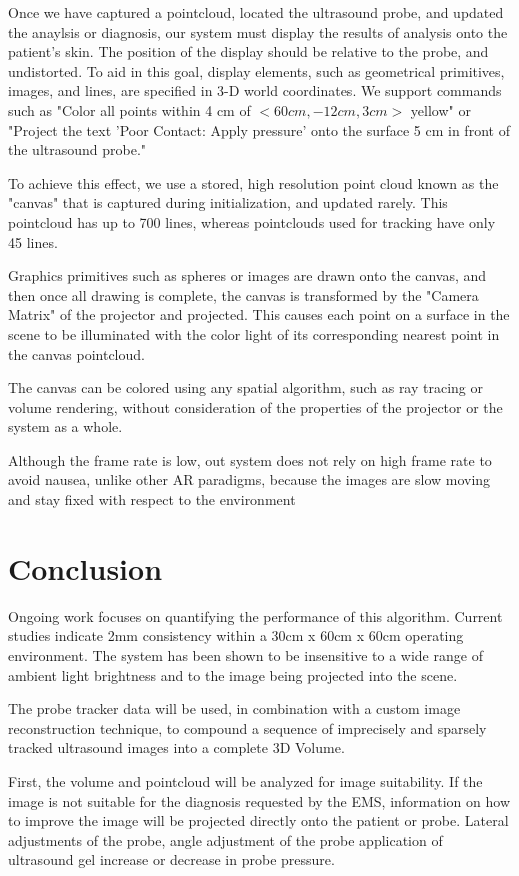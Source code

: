 \documentclass{llncs}
\begin{document}
Once we have captured a pointcloud, located the ultrasound probe, and updated the anaylsis or diagnosis, our system must display the results of analysis onto the patient's skin. The position of the display should be relative to the probe, and undistorted. To aid in this goal, display elements, such as geometrical primitives, images, and lines, are specified in 3-D world coordinates. We support commands such as "Color all points within 4 cm of $<60 cm, -12 cm, 3 cm>$ yellow" or "Project the text 'Poor Contact: Apply pressure' onto the surface 5 cm in front of the ultrasound probe."

To achieve this effect, we use a stored, high resolution point cloud known as the "canvas" that is captured during initialization, and updated rarely. This pointcloud has up to 700 lines, whereas pointclouds used for tracking have only 45 lines. 

Graphics primitives such as spheres or images are drawn onto the canvas, and then once all drawing is complete, the canvas is transformed by the "Camera Matrix" of the projector and projected. This causes each point on a surface in the scene to be illuminated with the color light of its corresponding nearest point in the canvas pointcloud. 

The canvas can be colored using any spatial algorithm, such as ray tracing or volume rendering, without consideration of the properties of the projector or the system as a whole.

Although the frame rate is low, out system does not rely on high frame rate to avoid nausea, unlike other AR paradigms, because the images are slow moving and stay fixed with respect to the environment 

\section{Conclusion}
Ongoing work focuses on quantifying the performance of this algorithm.  Current studies indicate 2mm consistency within a 30cm x 60cm x 60cm operating environment.  The system has been shown to be insensitive to a wide range of ambient light brightness and to the image being projected into the scene.

The probe tracker data will be used, in combination with a custom image reconstruction technique, to compound a sequence of imprecisely and sparsely tracked ultrasound images into a complete 3D Volume.

First, the volume and pointcloud will be analyzed for image suitability. If the image is not suitable for the diagnosis requested by the EMS, information on how to improve the image will be projected directly onto the patient or probe. Lateral adjustments of the probe,
angle adjustment of the probe
application of ultrasound gel
increase or decrease in probe pressure.
\end{document}
